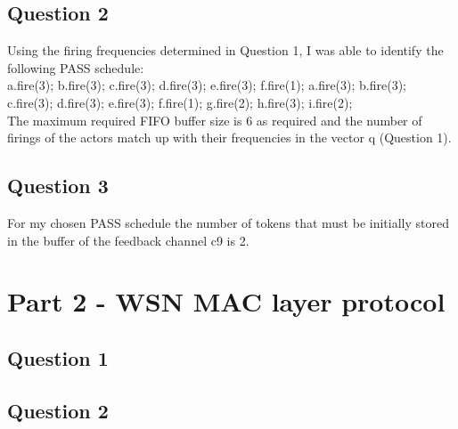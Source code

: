 \documentclass[12pt]{article} %
\begin{document}

\subsection{Question 2} %
Using the firing frequencies determined in Question 1, I was able to identify the following PASS schedule: \\

a.fire(3); b.fire(3); c.fire(3); d.fire(3); e.fire(3); f.fire(1); a.fire(3); b.fire(3); c.fire(3); d.fire(3); e.fire(3); f.fire(1); g.fire(2); h.fire(3); i.fire(2);
\\

The maximum required FIFO buffer size is 6 as required and the number of firings of the actors match up with their frequencies in the vector q (Question 1).


\subsection{Question 3} %
For my chosen PASS schedule the number of tokens that must be initially stored in the buffer of the feedback channel c9 is \large 2.




\section{Part 2 - WSN MAC layer protocol} %



\subsection{Question 1} %


\subsection{Question 2} %
\end{document}
